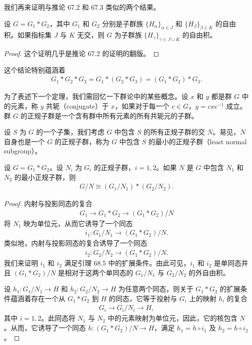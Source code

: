 \documentclass[../../main.tex]{subfiles}
\begin{document}
我们再来证明与推论 67.2 和 67.3 类似的两个结果。

\begin{corollary}\label{corollary:ch11-free-product-associativity}
设 $G=G_1*G_2$，其中 $G_1$ 和 $G_2$ 分别是子群族 $\{H_\alpha\}_{\alpha\in J}$ 和 $\{H_\beta\}_{\beta\in K}$ 的自由积。如果指标集 $J$ 与 $K$ 无交，则 $G$ 为子群族 $\{H_\gamma\}_{\gamma\in J\cup K}$ 的自由积。
\end{corollary}

\begin{proof}
这个证明几乎是推论 67.2 的证明的翻版。
\end{proof}

这个结论特别蕴涵着
\begin{align*}
G_1*G_2*G_3=G_1*(G_2*G_3)=(G_1*G_2)*G_3.
\end{align*}

为了表述下一个定理，我们需回忆一下群论中的某些概念。设 $x$ 和 $y$ 都是群 $G$ 中的元素，称 $y$ 共轭（conjugate）于 $x$，如果对于每一个 $c\in G$，$y=cxc^{-1}$ 成立。群 $G$ 的正规子群是一个含有群中所有元素的所有共轭元的子群。

设 $S$ 为 $G$ 的一个子集，我们考虑 $G$ 中包含 $S$ 的所有正规子群的交 $N$。易见，$N$ 自身也是一个 $G$ 的正规子群，称为 $G$ 中包含 $S$ 的最小的正规子群（least normal subgroup）。

\begin{theorem}\label{theorem:ch11-quotient-of-free-product}
设 $G=G_1*G_2$。设 $N_i$ 为 $G_i$ 的正规子群，$i=1,2$。如果 $N$ 是 $G$ 中包含 $N_1$ 和 $N_2$ 的最小正规子群，则
\begin{align*}
G/N\cong(G_1/N_1)*(G_2/N_2).
\end{align*}
\end{theorem}

\begin{proof}
内射与投影同态的复合
\begin{align*}
G_1\longrightarrow G_1*G_2\longrightarrow(G_1*G_2)/N
\end{align*}
将 $N_1$ 映为单位元，从而它诱导了一个同态
\begin{align*}
i_1:G_1/N_1\longrightarrow(G_1*G_2)/N.
\end{align*}
类似地，内射与投影同态的复合诱导了一个同态
\begin{align*}
i_2:G_2/N_2\longrightarrow(G_1*G_2)/N.
\end{align*}
我们来证明 $i_1$ 和 $i_2$ 满足引理 68.5 中的扩展条件。由此可见，$i_1$ 和 $i_2$ 是单同态并且 $(G_1*G_2)/N$ 是相对于这两个单同态的 $G_1/N_1$ 与 $G_2/N_2$ 的外自由积。

设 $h_1:G_1/N_1\to H$ 和 $h_2:G_2/N_2\to H$ 为任意两个同态，则关于 $G_1*G_2$ 的扩展条件蕴涵着存在一个从 $G_1*G_2$ 到 $H$ 的同态，它等于投射与 $G_i$ 上的映射 $h_i$ 的复合
\begin{align*}
G_i\longrightarrow G_i/N_i\longrightarrow H,
\end{align*}
其中 $i=1,2$。此同态将 $N_1$ 与 $N_2$ 中的元素映射为单位元，因此，它的核包含 $N$。从而，它诱导了一个同态 $h:(G_1*G_2)/N\to H$，满足 $h_1=h\circ i_1$ 及 $h_2=h\circ i_2$。
\end{proof}
\end{document}
